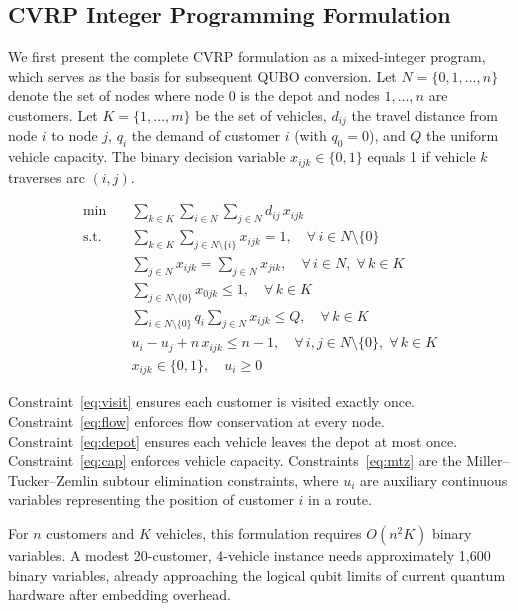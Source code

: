 \documentclass[preprint,3p,12pt,authoryear]{elsarticle}
\begin{document}
{\color{red}\subsection{CVRP Integer Programming Formulation}

We first present the complete CVRP formulation as a mixed-integer program, which serves as the basis for subsequent QUBO conversion. Let $N = \{0, 1, \ldots, n\}$ denote the set of nodes where node $0$ is the depot and nodes $1, \ldots, n$ are customers. Let $K = \{1, \ldots, m\}$ be the set of vehicles, $d_{ij}$ the travel distance from node $i$ to node $j$, $q_i$ the demand of customer $i$ (with $q_0 = 0$), and $Q$ the uniform vehicle capacity. The binary decision variable $x_{ijk} \in \{0,1\}$ equals 1 if vehicle $k$ traverses arc $(i,j)$.

\begin{align}
\min \quad & \sum_{k \in K} \sum_{i \in N} \sum_{j \in N} d_{ij}\, x_{ijk} \label{eq:obj} \\
\text{s.t.} \quad & \sum_{k \in K} \sum_{j \in N \setminus \{i\}} x_{ijk} = 1, \quad \forall\, i \in N \setminus \{0\} \label{eq:visit} \\
& \sum_{j \in N} x_{ijk} = \sum_{j \in N} x_{jik}, \quad \forall\, i \in N,\; \forall\, k \in K \label{eq:flow} \\
& \sum_{j \in N \setminus \{0\}} x_{0jk} \leq 1, \quad \forall\, k \in K \label{eq:depot} \\
& \sum_{i \in N \setminus \{0\}} q_i \sum_{j \in N} x_{ijk} \leq Q, \quad \forall\, k \in K \label{eq:cap} \\
& u_i - u_j + n\, x_{ijk} \leq n - 1, \quad \forall\, i,j \in N \setminus \{0\},\; \forall\, k \in K \label{eq:mtz} \\
& x_{ijk} \in \{0,1\}, \quad u_i \geq 0 \label{eq:binary}
\end{align}

Constraint~\eqref{eq:visit} ensures each customer is visited exactly once. Constraint~\eqref{eq:flow} enforces flow conservation at every node. Constraint~\eqref{eq:depot} ensures each vehicle leaves the depot at most once. Constraint~\eqref{eq:cap} enforces vehicle capacity. Constraints~\eqref{eq:mtz} are the Miller--Tucker--Zemlin subtour elimination constraints, where $u_i$ are auxiliary continuous variables representing the position of customer $i$ in a route.

For $n$ customers and $K$ vehicles, this formulation requires $O(n^2 K)$ binary variables. A modest 20-customer, 4-vehicle instance needs approximately 1,600 binary variables, already approaching the logical qubit limits of current quantum hardware after embedding overhead.}
\end{document}
